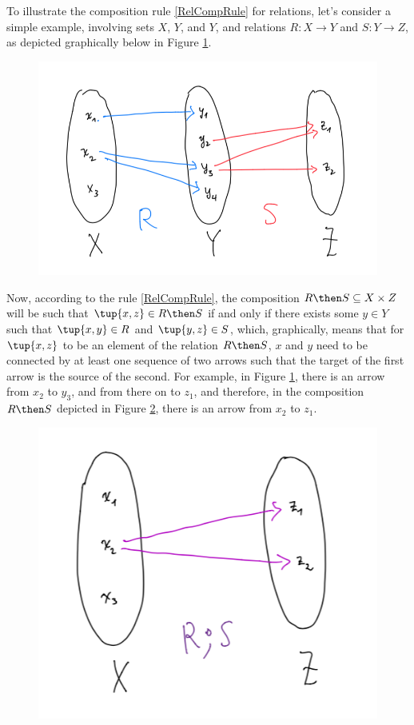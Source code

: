 To illustrate the composition rule \ref{RelCompRule} for relations, let's consider a simple example, involving sets $X$, $Y$, and $Y$, and relations $R : X \rightarrow Y$ and $S : Y \rightarrow Z$, as depicted graphically below in Figure \ref{fig:example_rel_composable}. 
\begin{figure}[h!]
\centering
 \includegraphics[width=0.5\linewidth]{pics/dist_net_9.png}
 \caption{}
\label{fig:example_rel_composable}
\end{figure}


Now, according to the rule \ref{RelCompRule}, the composition $R \then S \subseteq X \times Z$ will be such that  $\tup{x,z} \in R \then S$ if and only if there exists some $y \in Y$ such that $\tup{x,y} \in R$ and $\tup{y,z} \in S$, which, graphically, means that for $\tup{x,z}$ to be an element of the relation $R \then S$, $x$ and $y$ need to be connected by at least one sequence of two arrows such that the target of the first arrow is the source of the second. For example, in Figure \ref{fig:example_rel_composable}, there is an arrow from $x_2$ to $y_3$, and from there on to $z_1$, and therefore, in the composition $R \then S$ depicted in Figure \ref{fig:example_rel_composed}, there is an arrow from $x_2$ to $z_1$. 
\begin{figure}[h!]
\centering
 \includegraphics[width=0.5\linewidth]{pics/dist_net_10.png}
 \caption{}
\label{fig:example_rel_composed}
\end{figure}


\

\



